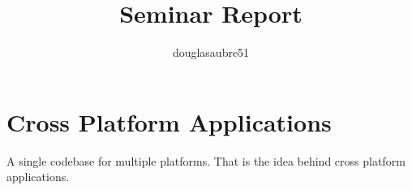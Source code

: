 \documentclass[14pt]{extarticle}
\title{
     \Huge Seminar Report 
}
\author{
    douglasaubre51
}
\begin{document}
\maketitle
{}

\newpage
{}

\section{
  Cross Platform Applications
 }
A single codebase for multiple platforms. That is the idea behind cross platform applications.
\end{document}
